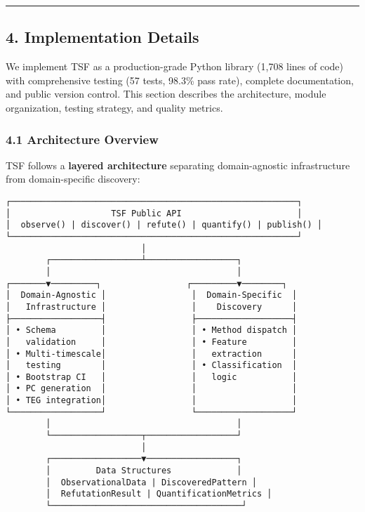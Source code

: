 \documentclass[
]{article}
\begin{document}
\begin{center}\rule{0.5\linewidth}{0.5pt}\end{center}

\subsection{4. Implementation Details}\label{implementation-details}

We implement TSF as a production-grade Python library (1,708 lines of
code) with comprehensive testing (57 tests, 98.3\% pass rate), complete
documentation, and public version control. This section describes the
architecture, module organization, testing strategy, and quality
metrics.

\subsubsection{4.1 Architecture Overview}\label{architecture-overview}

TSF follows a \textbf{layered architecture} separating domain-agnostic
infrastructure from domain-specific discovery:

\begin{verbatim}
┌─────────────────────────────────────────────────────────┐
│                    TSF Public API                       │
│  observe() | discover() | refute() | quantify() | publish() │
└─────────────────────────────────────────────────────────┘
                           │
        ┌──────────────────┴──────────────────┐
        │                                     │
┌───────▼─────────┐                 ┌─────────▼────────┐
│  Domain-Agnostic │                 │  Domain-Specific  │
│   Infrastructure │                 │    Discovery      │
├──────────────────┤                 ├───────────────────┤
│ • Schema         │                 │ • Method dispatch │
│   validation     │                 │ • Feature         │
│ • Multi-timescale│                 │   extraction      │
│   testing        │                 │ • Classification  │
│ • Bootstrap CI   │                 │   logic           │
│ • PC generation  │                 │                   │
│ • TEG integration│                 │                   │
└──────────────────┘                 └───────────────────┘
        │                                     │
        └──────────────────┬──────────────────┘
                           │
        ┌──────────────────▼──────────────────┐
        │         Data Structures             │
        │  ObservationalData | DiscoveredPattern │
        │  RefutationResult | QuantificationMetrics │
        └──────────────────────────────────────┘
\end{verbatim}
\end{document}
